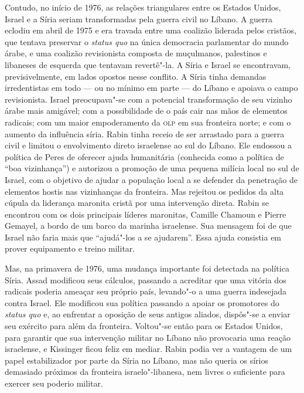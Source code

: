 Contudo, no início de 1976, as relações triangulares entre os Estados Unidos,
Israel e a Síria seriam transformadas pela guerra civil no Líbano. A
guerra eclodiu em abril de 1975 e era travada entre uma coalizão
liderada pelos cristãos, que tentava preservar o \textit{status quo} na
única democracia parlamentar do mundo árabe, e uma coalizão revisionista
composta de muçulmanos, palestinos e libaneses de esquerda que tentavam
revertê"-la. A Síria e Israel se encontravam, previsivelmente, em lados
opostos nesse conflito. A Síria tinha demandas irredentistas em todo ---
ou no mínimo em parte --- do Líbano e apoiava o campo revisionista.
Israel preocupava"-se com a potencial transformação de seu vizinho árabe
mais amigável; com a possibilidade de o país cair nas mãos de elementos
radicais; com um maior empoderamento da \textsc{olp} em sua fronteira norte; e
com o aumento da influência síria. Rabin tinha receio de ser arrastado
para a guerra civil e limitou o envolvimento direto israelense ao sul do
Líbano. Ele endossou a política de Peres de oferecer ajuda humanitária
(conhecida como a política de ``boa vizinhança'') e autorizou a promoção de
uma pequena milícia local no sul de Israel, com o objetivo de ajudar a população
local a se defender da penetração de elementos hostis nas vizinhanças da
fronteira. Mas rejeitou os pedidos da alta cúpula da liderança maronita
cristã por uma intervenção direta. Rabin se encontrou com os dois
principais líderes maronitas, Camille Chamoun e Pierre Gemayel, a bordo
de um barco da marinha israelense. Sua mensagem foi de que Israel não
faria mais que ``ajudá"-los a se ajudarem''. Essa ajuda consistia em
prover equipamento e treino militar.

Mas, na primavera de 1976, uma mudança importante foi detectada na
política Síria. Assad modificou seus cálculos, passando a acreditar que
uma vitória dos radicais poderia ameaçar seu próprio país, levando"-o a
uma guerra indesejada contra Israel. Ele modificou sua política passando
a apoiar os promotores do \textit{status quo} e, ao enfrentar a oposição
de seus antigos aliados, dispôs"-se a enviar seu exército para além da
fronteira. Voltou"-se então para os Estados Unidos, para garantir que sua
intervenção militar no Líbano não provocaria uma reação israelense, e
Kissinger ficou feliz em mediar. Rabin podia ver a vantagem de um papel
estabilizador por parte da Síria no Líbano, mas não queria os sírios
demasiado próximos da fronteira israelo"-libanesa, nem livres o
suficiente para exercer seu poderio militar.


